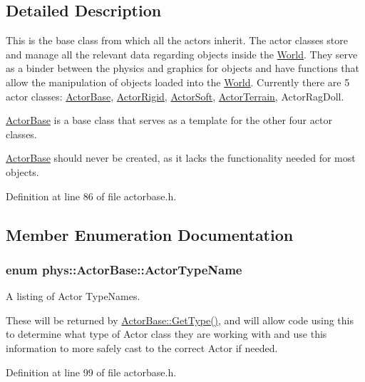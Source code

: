 \subsection{Detailed Description}
This is the base class from which all the actors inherit. The actor classes store and manage all the relevant data regarding objects inside the \hyperlink{classphys_1_1World}{World}. They serve as a binder between the physics and graphics for objects and have functions that allow the manipulation of objects loaded into the \hyperlink{classphys_1_1World}{World}. Currently there are 5 actor classes: \hyperlink{classphys_1_1ActorBase}{ActorBase}, \hyperlink{classphys_1_1ActorRigid}{ActorRigid}, \hyperlink{classphys_1_1ActorSoft}{ActorSoft}, \hyperlink{classphys_1_1ActorTerrain}{ActorTerrain}, ActorRagDoll. \par
 \hyperlink{classphys_1_1ActorBase}{ActorBase} is a base class that serves as a template for the other four actor classes. \par
 \hyperlink{classphys_1_1ActorBase}{ActorBase} should never be created, as it lacks the functionality needed for most objects. 

Definition at line 86 of file actorbase.h.



\subsection{Member Enumeration Documentation}
\hypertarget{classphys_1_1ActorBase_aff3a7c464e8ce82576073f8f891434b7}{
\subsubsection[{ActorTypeName}]{\setlength{\rightskip}{0pt plus 5cm}enum {\bf phys::ActorBase::ActorTypeName}}}
\label{d8/d0f/classphys_1_1ActorBase_aff3a7c464e8ce82576073f8f891434b7}


A listing of Actor TypeNames. 

These will be returned by \hyperlink{classphys_1_1ActorBase_ab8bedea2ef0ce9194731ebeb886333ff}{ActorBase::GetType()}, and will allow code using this to determine what type of Actor class they are working with and use this information to more safely cast to the correct Actor if needed. 

Definition at line 99 of file actorbase.h.



